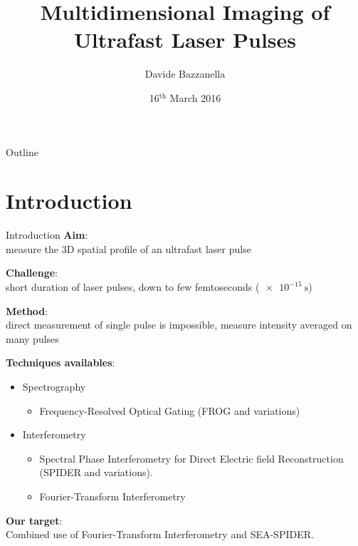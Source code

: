 \documentclass[11pt]{beamer}
\author{Davide Bazzanella}
\title{Multidimensional Imaging of Ultrafast Laser Pulses}
\institute{Imperial College London}
\date{16$^{\mathrm{th}}$ March 2016}
\begin{document}
\begin{frame}
\titlepage
\end{frame}

\begin{frame}{Outline}
\tableofcontents
\end{frame}

\section{Introduction}
\begin{frame}{Introduction}
\textbf{Aim}:\\
	measure the 3D spatial profile of an ultrafast laser pulse

	\vspace{15pt}
\textbf{Challenge}:\\
	short duration of laser pulses, down to few femtoseconds ($\SI{e-15}{\s}$)
	
	\vspace{15pt}
\textbf{Method}:\\
	direct measurement of single pulse is impossible,
	measure intensity averaged on many pulses
\end{frame}

\begin{frame}

\textbf{Techniques availables}:\\
\begin{itemize}
\item Spectrography
\begin{itemize}
\item Frequency-Resolved Optical Gating (FROG and variations)
\end{itemize}
\item Interferometry
\begin{itemize}
\item Spectral Phase Interferometry for Direct Electric field Reconstruction (SPIDER and variations).
\item Fourier-Transform Interferometry
\end{itemize}
\end{itemize}	

\textbf{Our target}:\\
Combined use of Fourier-Transform Interferometry and SEA-SPIDER.


\end{frame}
\end{document}
